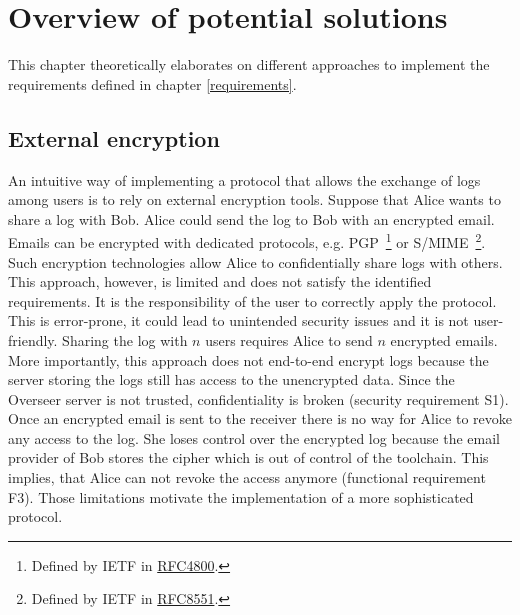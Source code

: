 \documentclass[../main.txt]{subfiles}
\begin{document}
\chapter{Overview of potential solutions}

This chapter theoretically elaborates on different approaches to implement the requirements defined in chapter \ref{requirements}.

\section{External encryption}
\label{sec:external_encryption}
An intuitive way of implementing a protocol that allows the exchange of logs among users is to rely on external encryption tools.
Suppose that Alice wants to share a log with Bob.
Alice could send the log to Bob with an encrypted email.
Emails can be encrypted with dedicated protocols, e.g. PGP~\footnote{Defined by IETF in \href{https://www.rfc-editor.org/rfc/rfc4880}{RFC4800}.} or S/MIME~\footnote{Defined by IETF in \href{https://www.rfc-editor.org/rfc/rfc8551.html}{RFC8551}.}.
Such encryption technologies allow Alice to confidentially share logs with others.
This approach, however, is limited and does not satisfy the identified requirements.
It is the responsibility of the user to correctly apply the protocol.
This is error-prone, it could lead to unintended security issues and it is not user-friendly.
Sharing the log with $n$ users requires Alice to send $n$ encrypted emails.
More importantly, this approach does not end-to-end encrypt logs because the server storing the logs still has access to the unencrypted data.
Since the Overseer server is not trusted, confidentiality is broken (security requirement S1).
Once an encrypted email is sent to the receiver there is no way for Alice to revoke any access to the log.
She loses control over the encrypted log because the email provider of Bob stores the cipher which is out of control of the toolchain.
This implies, that Alice can not revoke the access anymore (functional requirement F3).
Those limitations motivate the implementation of a more sophisticated protocol.
\end{document}

